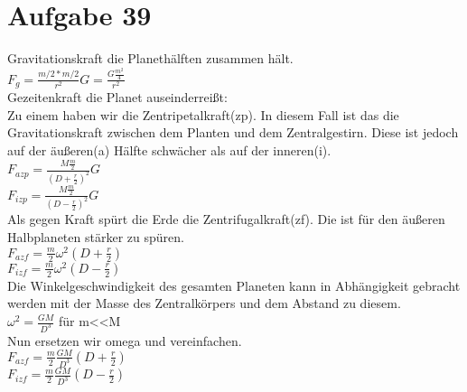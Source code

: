 \section{Aufgabe 39}
Gravitationskraft die Planethälften zusammen hält.\\
$F_g=\frac{m/2 * m/2}{r^2} G = \frac{G \frac{m^2}{4}}{r^2} $\\

Gezeitenkraft die Planet auseinderreißt:\\
Zu einem haben wir die Zentripetalkraft(zp). In diesem Fall ist das die Gravitationskraft zwischen dem Planten und dem Zentralgestirn. Diese ist jedoch auf der äußeren(a) Hälfte schwächer als auf der inneren(i). \\
$F_{azp} = \frac{M\frac{m}{2}}{(D+\frac{r}{2})^2}G $\\
$F_{izp} = \frac{M\frac{m}{2}}{(D-\frac{r}{2})^2}G $\\
Als gegen Kraft spürt die Erde die Zentrifugalkraft(zf). Die ist für den äußeren Halbplaneten stärker zu spüren.\\
$F_{azf} = \frac{m}{2}\omega^2(D + \frac{r}{2})$\\
$F_{izf} = \frac{m}{2}\omega^2(D - \frac{r}{2})$\\

Die Winkelgeschwindigkeit des gesamten Planeten kann in Abhängigkeit gebracht werden mit der Masse des Zentralkörpers und dem Abstand zu diesem.\\
$\omega^2 = \frac{G M}{D^3}$ für m<<M\\
Nun ersetzen wir omega und vereinfachen.\\
$F_{azf} = \frac{m}{2}\frac{G M}{D^3}(D + \frac{r}{2})$\\
$F_{izf} = \frac{m}{2}\frac{G M}{D^3}(D - \frac{r}{2})$\\

